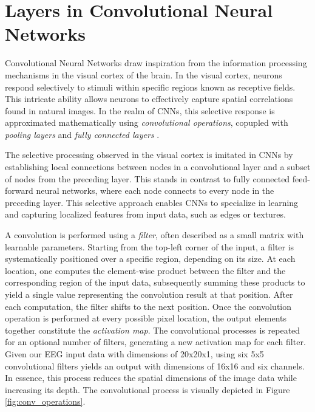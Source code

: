 \documentclass[a4paper, UKenglish, 11pt]{uiomaster}
\begin{document}
\FloatBarrier

\section{Layers in Convolutional Neural Networks}
Convolutional Neural Networks draw inspiration from the information processing mechanisms in the visual cortex of the brain. In the visual cortex, neurons respond selectively to stimuli within specific regions known as receptive fields. This intricate ability allows neurons to effectively capture spatial correlations found in natural images. In the realm of CNNs, this selective response is approximated mathematically using \emph{convolutional operations}, copupled with \emph{pooling layers} and \emph{fully connected layers} \cite{Hjorth-Jensen2022}.

The selective processing observed in the visual cortex is imitated in CNNs by establishing local connections between nodes in a convolutional layer and a subset of nodes from the preceding layer. This stands in contrast to fully connected feed-forward neural networks, where each node connects to every node in the preceding layer. This selective approach enables CNNs to specialize in learning and capturing localized features from input data, such as edges or textures.

A convolution is performed using a \emph{filter}, often described as a small matrix with learnable parameters. Starting from the top-left corner of the input, a filter is systematically positioned over a specific region, depending on its size. At each location, one computes the element-wise product between the filter and the corresponding region of the input data, subsequently summing these products to yield a single value representing the convolution result at that position. After each computation, the filter shifts to the next position. Once the convolution operation is performed at every possible pixel location, the output elements together constitute the \emph{activation map}. The convolutional processes is repeated for an optional number of filters, generating a new activation map for each filter. Given our EEG input data with dimensions of 20x20x1, using six 5x5 convolutional filters yields an output with dimensions of 16x16 and six channels. In essence, this process reduces the spatial dimensions of the image data while increasing its depth. The convolutional process is visually depicted in Figure \ref{fig:conv_operations}.
\end{document}
